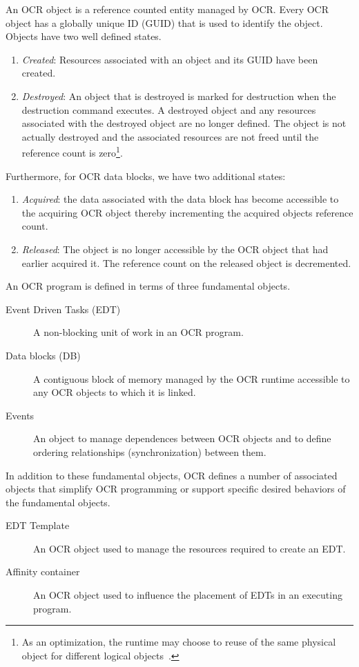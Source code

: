An OCR object is a reference counted entity managed by OCR. Every OCR
object has a globally unique ID (GUID) that is used to identify the
object. Objects have two well defined states.
\begin{enumerate}
\item \emph{Created}: Resources associated with an object and its GUID
have been created.
\item \emph{Destroyed}: An object that is destroyed is marked for
destruction when the destruction command executes. A destroyed object
and any resources associated with the destroyed object are no longer
defined. The object is not actually destroyed and the associated
resources are not freed until the reference count is zero\footnote{As
an optimization, the runtime may choose to reuse of the same physical
object for different logical objects~\cite{USBCSS12,SbKS12}.}.
%
\end{enumerate}
Furthermore, for OCR data blocks, we have two additional states:
\begin{enumerate}
\item \emph{Acquired}: the data associated with the data block has
become accessible to the acquiring OCR object thereby incrementing the
acquired objects reference count.
\item \emph{Released}: The object is no longer accessible by the OCR
object that had earlier acquired it. The reference count on the
released object is decremented.
\end{enumerate}

An OCR program is defined in terms of three fundamental objects.
\begin{description}
\item[Event Driven Tasks (EDT)] A non-blocking unit of work in an OCR
program.
\item[Data blocks (DB)] A contiguous block of memory managed by the
OCR runtime accessible to any OCR objects to which it is linked.
\item[Events] An object to manage dependences between OCR objects and
to define ordering relationships (synchronization) between them.
\end{description}

In addition to these fundamental objects, OCR defines a number of
associated objects that simplify OCR programming or support specific
desired behaviors of the fundamental objects.
\begin{description}
\item [EDT Template] An OCR object used to manage the resources
required to create an EDT.
\item [Affinity container] An OCR object used to influence the
placement of EDTs in an executing program.
\end{description}

